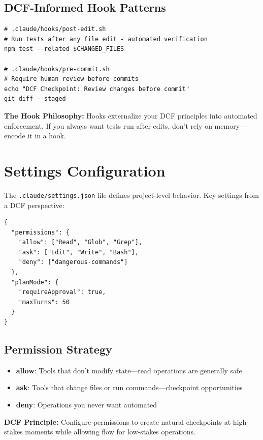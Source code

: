 \subsection{DCF-Informed Hook Patterns}

\begin{lstlisting}
# .claude/hooks/post-edit.sh
# Run tests after any file edit - automated verification
npm test --related $CHANGED_FILES

# .claude/hooks/pre-commit.sh
# Require human review before commits
echo "DCF Checkpoint: Review changes before commit"
git diff --staged
\end{lstlisting}

\textbf{The Hook Philosophy:} Hooks externalize your DCF principles into automated enforcement. If you always want tests run after edits, don't rely on memory---encode it in a hook.

\section{Settings Configuration}

The \texttt{.claude/settings.json} file defines project-level behavior. Key settings from a DCF perspective:

\begin{lstlisting}
{
  "permissions": {
    "allow": ["Read", "Glob", "Grep"],
    "ask": ["Edit", "Write", "Bash"],
    "deny": ["dangerous-commands"]
  },
  "planMode": {
    "requireApproval": true,
    "maxTurns": 50
  }
}
\end{lstlisting}

\subsection{Permission Strategy}

\begin{itemize}
    \item \textbf{allow}: Tools that don't modify state---read operations are generally safe
    \item \textbf{ask}: Tools that change files or run commands---checkpoint opportunities
    \item \textbf{deny}: Operations you never want automated
\end{itemize}

\textbf{DCF Principle:} Configure permissions to create natural checkpoints at high-stakes moments while allowing flow for low-stakes operations.


